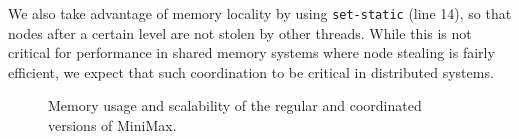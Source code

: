 We also take advantage of memory locality by using \texttt{set-static} (line
14), so that nodes after a certain level are not stolen by other threads. While
this is not critical for performance in shared memory systems where node
stealing is fairly efficient, we expect that such coordination to be critical in
distributed systems.

\begin{figure}[h!]
   \begin{center}
   \end{center}
   \caption{Memory usage and scalability of the regular and coordinated versions
      of MiniMax.}
   \label{results:memory_minmax}
\end{figure}

